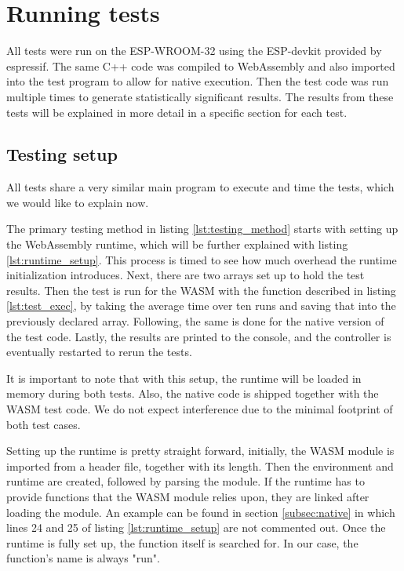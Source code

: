 \section{Running tests}

All tests were run on the ESP-WROOM-32 using the ESP-devkit provided by espressif. The same C++ code was compiled to WebAssembly and also imported into the test program to allow for native execution. Then the test code was run multiple times to generate statistically significant results. The results from these tests will be explained in more detail in a specific section for each test.

\subsection{Testing setup}\label{subsec:testing_setup}

All tests share a very similar main program to execute and time the tests, which we would like to explain now.



The primary testing method in listing \ref{lst:testing_method} starts with setting up the WebAssembly runtime, which will be further explained with listing \ref{lst:runtime_setup}. This process is timed to see how much overhead the runtime initialization introduces. Next, there are two arrays set up to hold the test results. Then the test is run for the WASM with the function described in listing \ref{lst:test_exec}, by taking the average time over ten runs and saving that into the previously declared array. Following, the same is done for the native version of the test code. Lastly, the results are printed to the console, and the controller is eventually restarted to rerun the tests.

It is important to note that with this setup, the runtime will be loaded in memory during both tests. Also, the native code is shipped together with the WASM test code. We do not expect interference due to the minimal footprint of both test cases.



Setting up the runtime is pretty straight forward, initially, the WASM module is imported from a header file, together with its length. Then the environment and runtime are created, followed by parsing the module. If the runtime has to provide functions that the WASM module relies upon, they are linked after loading the module. An example can be found in section \ref{subsec:native} in which lines 24 and 25 of listing \ref{lst:runtime_setup} are not commented out. Once the runtime is fully set up, the function itself is searched for. In our case, the function's name is always "run".

